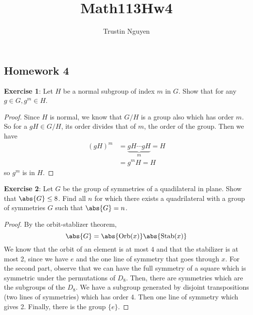 \documentclass{article}
\title{Math113Hw4}
\author{Trustin Nguyen}
\begin{document}
\maketitle
\reversemarginpar

\begin{topic}
	\section*{Homework 4}
\end{topic}

\textbf{Exercise 1}: Let $H$ be a normal subgroup of index $m$ in $G$. Show that for any $g \in G, g^{m} \in H$. 
\begin{proof}
	Since $H$ is normal, we know that $G/H$ is a group also which has order $m$. So for a $gH \in G/H$, its order divides that of $m$, the order of the group. Then we have
	\begin{align*}
		(gH)^{m} &= \underbrace{gH \cdots gH}_{m} = H \\
			 &=g^{m}H = H
	\end{align*}
	so $g^{m}$ is in $H$.
\end{proof}

\textbf{Exercise 2}: Let $G$ be the group of symmetries of a quadilateral in plane. Show that $\abs{G} \leq 8$. Find all $n$ for which there exists a quadrilateral with a group of symmetries $G$ such that $\abs{G} = n$.

\begin{proof}
	By the orbit-stablizer theorem, 
	\begin{equation*}
		\abs{G} = \abs{\text{Orb}(x)}\abs{\text{Stab}(x)}
	\end{equation*}
	We know that the orbit of an element is at most $4$ and that the stabilizer is at most 2, since we have $e$ and the one line of symmetry that goes through $x$. For the second part, observe that we can have the full symmetry of a square which is symmetric under the permutations of $D_{8}$. Then, there are symmetries which are the subgroups of the $D_{8}$. We have a subgroup generated by disjoint transpositions (two lines of symmetries) which has order 4. Then one line of symmetry which gives 2. Finally, there is the group $\{e\}$.
\end{proof}
\end{document}

